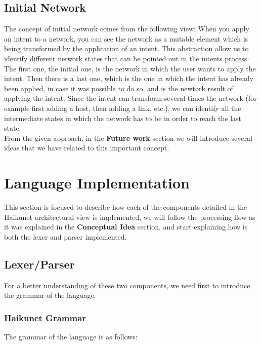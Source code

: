 \subsection{Initial Network}

The concept of initial network comes from the following view: When you apply an intent to a network, you can see the network as a mutable element which is being transformed by the application of an intent. This abstraction allow us to identify different network states that can be pointed out in the intents process: The first one, the initial one, is the network in which the user wants to apply the intent. Then there is a last one, which is the one in which the intent has already been applied, in case it was possible to do so, and is the newtork result of applying the intent. Since the intent can transform several times the network (for example first adding a host, then adding a link, etc.), we can identify all the intermediate states in which the network has to be in order to reach the last state. \\
From the given approach, in the \textbf{Future work} section we will introduce several ideas that we have related to this important concept.

\section{Language Implementation}

This section is focused to describe how each of the components detailed in the Haikunet architectural view is implemented, we will follow the processing flow as it was explained in the \textbf{Conceptual Idea} section, and start explaining how is both the lexer and parser implemented.

\subsection{Lexer/Parser}

For a better understanding of these two components, we need first to introduce the grammar of the language. 

\subsubsection{Haikunet Grammar}

The grammar of the language is as follows:

